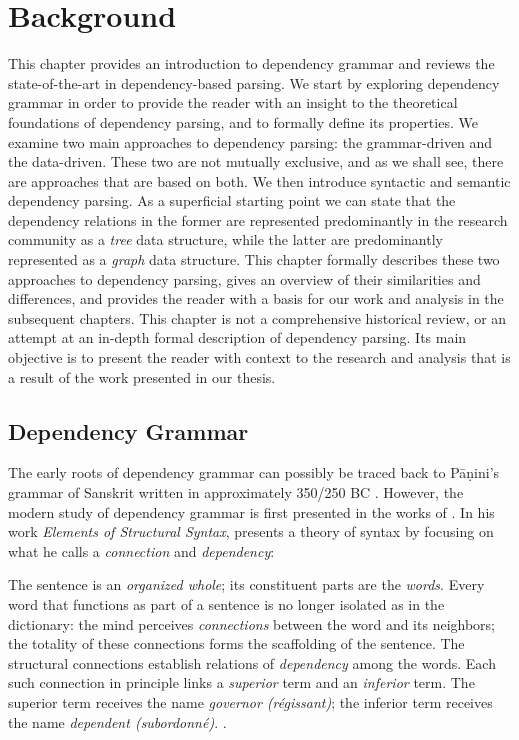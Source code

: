 \chapter{Background}
\label{chap:background}

This chapter provides an introduction to dependency grammar and reviews the state-of-the-art in dependency-based parsing. We start by exploring dependency grammar in order to provide the reader with an insight to the theoretical foundations of dependency parsing, and to formally define its properties. We examine two main approaches to dependency parsing: the grammar-driven and the data-driven. These two are not mutually exclusive, and as we shall see, there are approaches that are based on both. We then introduce syntactic and semantic dependency parsing. As a superficial starting point we can state that the dependency relations in the former are represented predominantly in the research community as a \textit{tree} data structure, while the latter are predominantly represented as a \textit{graph} data structure. This chapter formally describes these two approaches  to dependency parsing, gives an overview of their similarities and differences, and provides the reader with a basis for our work and analysis in the subsequent chapters. This chapter is not a comprehensive historical review, or an attempt at an in-depth formal description of dependency parsing. Its main objective is to present the reader with context to the research and analysis that is a result of the work presented in our thesis.

\section{Dependency Grammar}
The early roots of dependency grammar can possibly be traced back to P\={a}\d{n}ini's grammar of Sanskrit written in approximately 350/250 BC \cite{Kruijff:02}. However, the modern study of  dependency grammar is first presented in the works of \citeauthor{Tes:15}. In his work \textit{Elements of Structural Syntax}, \citeauthor{Tes:15} presents a theory of syntax by focusing on what he calls a \textit{connection} and \textit{dependency}:

\begin{displayquote}
The sentence is an \textit{organized whole}; its constituent parts are the \textit{words}. Every word that functions as part of a sentence is no longer isolated as in the dictionary: the mind perceives \textit{connections} between the word and its neighbors; the totality of these connections forms the scaffolding of the sentence. The structural connections establish relations of \textit{dependency} among the words. Each such connection in principle links a \textit{superior} term and an \textit{inferior} term. The superior term receives the name \textit{governor (r\'{e}gissant)}; the inferior term receives the name \textit{dependent (subordonn\'{e})}. \cite{Tes:15}.
\end{displayquote}

